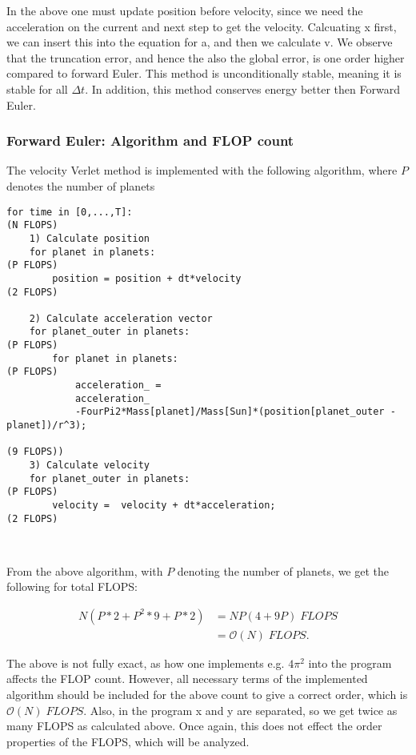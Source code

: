 \documentclass{article}
\begin{document}
In the above one must update position before velocity, since we need the acceleration on the current and next step to get the velocity. Calcuating x first, we can insert this into the equation for a, and then we calculate v. We observe that the truncation error, and hence the also the global error, is one order higher compared to forward Euler. This method is unconditionally stable, meaning it is stable for all $\Delta t$. In addition, this method conserves energy better then Forward Euler.

\subsubsection{Forward Euler: Algorithm and FLOP count}

The velocity Verlet method is implemented with the following algorithm, where $P$ denotes the number of planets

\begin{lstlisting}
for time in [0,...,T]: 						      									(N FLOPS)
	1) Calculate position
	for planet in planets:                        								(P FLOPS)
		position = position + dt*velocity         								(2 FLOPS)
	
	2) Calculate acceleration vector
	for planet_outer in planets: 														(P FLOPS)
		for planet in planets:															(P FLOPS)
			acceleration_ = 
			acceleration_ 
			-FourPi2*Mass[planet]/Mass[Sun]*(position[planet_outer - planet])/r^3);  
																								(9 FLOPS))
	3) Calculate velocity
	for planet_outer in planets: 														(P FLOPS)
		velocity =  velocity + dt*acceleration;            					(2 FLOPS)

			
\end{lstlisting}

From the above algorithm, with $P$ denoting the number of planets, we get the following for total FLOPS:

\begin{subequations}
	\begin{align}
	N\left(P*2 + P^2*9 + P*2 \right) &= NP(4 + 9P)\;FLOPS\\ 
	&= \mathcal{O}(N)\;FLOPS.
	\end{align}
\end{subequations}

The above is not fully exact, as how one implements e.g. $4 \pi^2$ into the program affects the FLOP count. However, all necessary terms of the implemented algorithm should be included for the above count to give a correct order, which is $\mathcal{O}(N)\;FLOPS$. Also, in the program x and y are separated, so we get twice as many FLOPS as calculated above. Once again, this does not effect the order properties of the FLOPS, which will be analyzed.
\end{document}
